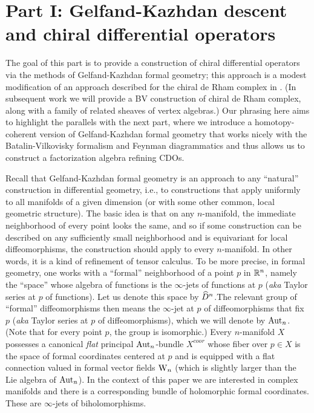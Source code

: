 \part*{Part I: Gelfand-Kazhdan descent and chiral differential
  operators}

The goal of this part is to provide a construction of chiral differential operators via the methods of Gelfand-Kazhdan formal geometry; this approach is a modest modification of an approach described for the chiral de Rham complex in \cite{MSV}. (In subsequent work we will provide a BV construction of chiral de Rham complex, along with a family of related sheaves of vertex algebras.) Our phrasing here aims to highlight the parallels with the next part, where we introduce a homotopy-coherent version of Gelfand-Kazhdan formal geometry that works nicely with the Batalin-Vilkovisky formalism and Feynman diagrammatics and thus allows us to construct a factorization algebra refining CDOs.

Recall that Gelfand-Kazhdan formal geometry is an approach to any ``natural'' construction in differential geometry, i.e., to constructions that apply uniformly to all manifolds of a given dimension (or with some other common, local geometric structure). The basic idea is that on any $n$-manifold, the immediate neighborhood of every point looks the same, and so if some construction can be described on any sufficiently small neighborhood and is equivariant for local diffeomorphisms, the construction should apply to every $n$-manifold. In other words, it is a kind of refinement of tensor calculus. To be more precise, in formal geometry, one works with a ``formal'' neighborhood of a point $p$ in $\mathbb R^n$, namely the ``space'' whose algebra of functions is the $\infty$-jets of functions at $p$ ({\em aka} Taylor series at $p$ of functions). Let us denote this space by $\widehat{D}^n$.The relevant group of ``formal'' diffeomorphisms then means the $\infty$-jet at $p$ of diffeomorphisms that fix $p$ ({\em aka} Taylor series at $p$ of diffeomorphisms), which we will denote by ${\rm Aut}_n$. (Note that for every point $p$, the group is isomorphic.) Every $n$-manifold $X$ possesses a canonical {\em flat} principal ${\rm Aut}_n$-bundle $X^{coor}$ whose fiber over $p \in X$ is the space of formal coordinates centered at $p$ and is equipped with a flat connection valued in formal vector fields ${{\rm W}_n}$ (which is slightly larger than the Lie algebra of ${\rm Aut}_n$).  In the context of this paper we are interested in complex manifolds and there is a corresponding bundle of holomorphic formal coordinates. These are $\infty$-jets of biholomorphisms.

